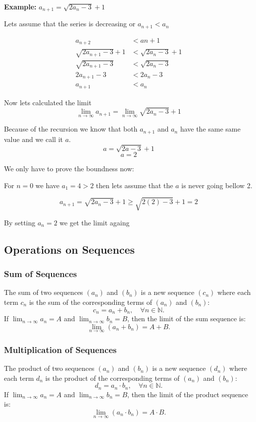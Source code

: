 \textbf{Example: } \(a_{n + 1} = \sqrt{2a_n - 3} + 1\)

Lets assume that the series is decreasing or \(a_{n + 1} < a_{n}\)

\begin{align*}
    a_{n + 2} &< a{n + 1} \\
    \sqrt{2a_{n + 1} -3} + 1 &< \sqrt{2a_{n} - 3} + 1 \\
    \sqrt{2a_{n + 1} -3} &< \sqrt{2a_{n} - 3} \\
    2a_{n + 1} - 3 &< 2a_{n} - 3 \\
    a_{n + 1} &< a_{n}
\end{align*}
\QED

Now lets calculated the limit
\[
\lim_{n \rightarrow \infty} a_{n + 1} = \lim_{n \rightarrow \infty} \sqrt{2a_n - 3} + 1
\]

Because of the recursion we know that both \(a_{n + 1}\) and \(a_n\) have the same same value and we call it \(a\).
\[
a = \sqrt{2a -3} +1
\]
\[
a = 2
\]

We only have to prove the boundness now:

For \(n = 0\) we have \(a_1 = 4 > 2\) then lets assume that the \(a\) is never going bellow 2.

\[
a_{n + 1} = \sqrt{2a_n - 3} + 1 \ge \sqrt{2(2) - 3} + 1 = 2
\]

By setting \(a_n = 2\) we get the limit againg

\QED

\subsection{Operations on Sequences}

\subsubsection{Sum of Sequences}
The sum of two sequences \((a_n)\) and \((b_n)\) is a new sequence \((c_n)\) where each term \(c_n\) is the sum of the corresponding terms of \((a_n)\) and \((b_n)\):
\[
c_n = a_n + b_n, \quad \forall n \in \mathbb{N}.
\]
If \(\lim_{n \to \infty} a_n = A\) and \(\lim_{n \to \infty} b_n = B\), then the limit of the sum sequence is:
\[
\lim_{n \to \infty} (a_n + b_n) = A + B.
\]

\subsubsection{Multiplication of Sequences}
The product of two sequences \((a_n)\) and \((b_n)\) is a new sequence \((d_n)\) where each term \(d_n\) is the product of the corresponding terms of \((a_n)\) and \((b_n)\):
\[
d_n = a_n \cdot b_n, \quad \forall n \in \mathbb{N}.
\]
If \(\lim_{n \to \infty} a_n = A\) and \(\lim_{n \to \infty} b_n = B\), then the limit of the product sequence is:
\[
\lim_{n \to \infty} (a_n \cdot b_n) = A \cdot B.
\]

